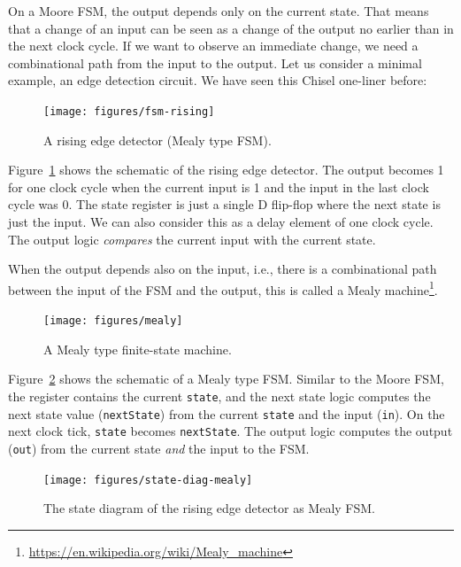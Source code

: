 \documentclass[%
    10pt,
    headinclude, footexclude,
    openright, %
    notitlepage,
    cleardoubleempty,
    headsepline,
    pointlessnumbers,
    bibtotoc, idxtotoc,
    ]{scrbook}
\newcommand{\code}[1]{{\small{\texttt{#1}}}}
\newcommand{\myref}[2]{\href{#1}{#2}}
\renewcommand{\myref}[2]{{#2}{\footnote{\url{#1}}}}
\begin{document}
On a Moore FSM, the output depends only on the current state.
That means that a change of an input can be seen as a change of the
output no earlier than in the next clock cycle.
If we want to observe an immediate change, we need a combinational
path from the input to the output.
Let us consider a minimal example, an edge detection circuit.
We have seen this Chisel one-liner before:


\begin{figure}
  \centering
  \texttt{[image: figures/fsm-rising]}
  \caption{A rising edge detector (Mealy type FSM).}
  \label{fig:fsm-rising}
\end{figure}

Figure~\ref{fig:fsm-rising} shows the schematic of the rising edge detector.
The output becomes 1 for one clock cycle when the current input is 1
and the input in the last clock cycle was 0.
The state register is just a single D flip-flop where the next state
is just the input. We can also consider this as a delay element of one
clock cycle. The output logic \emph{compares} the current
input with the current state.



When the output depends also on the input, i.e., there is a combinational path between
the input of the FSM and the output, this is called a
\myref{https://en.wikipedia.org/wiki/Mealy_machine}{Mealy machine}.

\begin{figure}
  \centering
  \texttt{[image: figures/mealy]}
  \caption{A Mealy type finite-state machine.}
  \label{fig:mealy}
\end{figure}

Figure~\ref{fig:mealy} shows the schematic of a Mealy type FSM.
Similar to the Moore FSM, the register contains the current \code{state}, and
the next state logic computes the next state value (\code{nextState})
from the current \code{state} and the input (\code{in}).
On the next clock tick, \code{state} becomes \code{nextState}.
The output logic computes the output (\code{out}) from the current state
\emph{and} the input to the FSM.


\begin{figure}
  \centering
  \texttt{[image: figures/state-diag-mealy]}
  \caption{The state diagram of the rising edge detector as Mealy FSM.}
  \label{fig:diag:mealy}
\end{figure}
\end{document}
